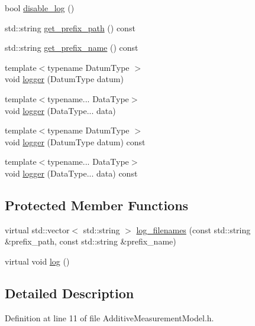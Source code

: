 \begin{DoxyCompactItemize}
bool \mbox{\hyperlink{classbfl_1_1Logger_a440467a28ccc46490d767fe0ef6f556a}{disable\+\_\+log}} ()
\item 
std\+::string \mbox{\hyperlink{classbfl_1_1Logger_a56cf1a4e712bf23d9978420a8a59a62b}{get\+\_\+prefix\+\_\+path}} () const
\item 
std\+::string \mbox{\hyperlink{classbfl_1_1Logger_a913a795b7bfbf378815eeb342d68a7c0}{get\+\_\+prefix\+\_\+name}} () const
\item 
{\footnotesize template$<$typename Datum\+Type $>$ }\\void \mbox{\hyperlink{classbfl_1_1Logger_a1033ff31398484f2132f84fd140da9e3}{logger}} (Datum\+Type datum)
\item 
{\footnotesize template$<$typename... Data\+Type$>$ }\\void \mbox{\hyperlink{classbfl_1_1Logger_aca2086c9256e5c404872b91f7f25b97d}{logger}} (Data\+Type... data)
\item 
{\footnotesize template$<$typename Datum\+Type $>$ }\\void \mbox{\hyperlink{classbfl_1_1Logger_a50b1c109730fa98f66e66f420f0158fe}{logger}} (Datum\+Type datum) const
\item 
{\footnotesize template$<$typename... Data\+Type$>$ }\\void \mbox{\hyperlink{classbfl_1_1Logger_a0f0cf7ce956546d94dfb1feb7cebf171}{logger}} (Data\+Type... data) const
\end{DoxyCompactItemize}
\subsection*{Protected Member Functions}
\begin{DoxyCompactItemize}
\item 
virtual std\+::vector$<$ std\+::string $>$ \mbox{\hyperlink{classbfl_1_1Logger_a328ceaa8e70e6918f11142b12b8be217}{log\+\_\+filenames}} (const std\+::string \&prefix\+\_\+path, const std\+::string \&prefix\+\_\+name)
\item 
virtual void \mbox{\hyperlink{classbfl_1_1Logger_ad44f46593cb8c4c87c1178eb326e2f64}{log}} ()
\end{DoxyCompactItemize}


\subsection{Detailed Description}


Definition at line 11 of file Additive\+Measurement\+Model.\+h.



